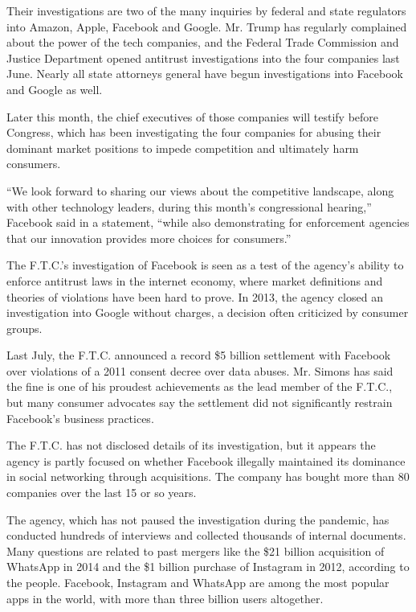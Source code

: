 Their investigations are two of the many inquiries by federal and state
regulators into Amazon, Apple, Facebook and Google. Mr. Trump has
regularly complained about the power of the tech companies, and the
Federal Trade Commission and Justice Department opened antitrust
investigations into the four companies last June. Nearly all state
attorneys general have begun investigations into Facebook and Google as
well.

Later this month, the chief executives of those companies will testify
before Congress, which has been investigating the four companies for
abusing their dominant market positions to impede competition and
ultimately harm consumers.

``We look forward to sharing our views about the competitive landscape,
along with other technology leaders, during this month's congressional
hearing,'' Facebook said in a statement, ``while also demonstrating for
enforcement agencies that our innovation provides more choices for
consumers.''

The F.T.C.'s investigation of Facebook is seen as a test of the agency's
ability to enforce antitrust laws in the internet economy, where market
definitions and theories of violations have been hard to prove. In 2013,
the agency closed an investigation into Google without charges, a
decision often criticized by consumer groups.

Last July, the F.T.C. announced a record \$5 billion settlement with
Facebook over violations of a 2011 consent decree over data abuses. Mr.
Simons has said the fine is one of his proudest achievements as the lead
member of the F.T.C., but many consumer advocates say the settlement did
not significantly restrain Facebook's business practices.

The F.T.C. has not disclosed details of its investigation, but it
appears the agency is partly focused on whether Facebook illegally
maintained its dominance in social networking through acquisitions. The
company has bought more than 80 companies over the last 15 or so years.

The agency, which has not paused the investigation during the pandemic,
has conducted hundreds of interviews and collected thousands of internal
documents. Many questions are related to past mergers like the \$21
billion acquisition of WhatsApp in 2014 and the \$1 billion purchase of
Instagram in 2012, according to the people. Facebook, Instagram and
WhatsApp are among the most popular apps in the world, with more than
three billion users altogether.

